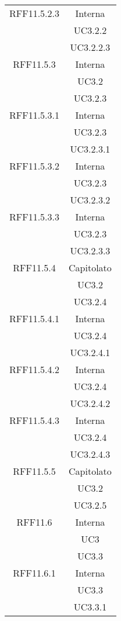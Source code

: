 \begin{longtable}{|c|c|}
\midrule
RFF11.5.2.3
& Interna\\
& UC3.2.2\\
& UC3.2.2.3\\

\midrule
RFF11.5.3
& Interna\\
& UC3.2\\
& UC3.2.3\\

\midrule
RFF11.5.3.1
& Interna\\
& UC3.2.3\\
& UC3.2.3.1\\

\midrule
RFF11.5.3.2
& Interna\\
& UC3.2.3\\
& UC3.2.3.2\\

\midrule
RFF11.5.3.3
& Interna\\
& UC3.2.3\\
& UC3.2.3.3\\

\midrule
RFF11.5.4
& Capitolato\\
& UC3.2\\
& UC3.2.4\\

\midrule
RFF11.5.4.1
& Interna\\
& UC3.2.4\\
& UC3.2.4.1\\

\midrule
RFF11.5.4.2
& Interna\\
& UC3.2.4\\
& UC3.2.4.2\\

\midrule
RFF11.5.4.3
& Interna\\
& UC3.2.4\\
& UC3.2.4.3\\

\midrule
RFF11.5.5
& Capitolato\\
& UC3.2\\
& UC3.2.5\\

\midrule
RFF11.6
& Interna\\
& UC3\\
& UC3.3\\

\midrule
RFF11.6.1
& Interna\\
& UC3.3\\
& UC3.3.1\\


\end{longtable}
